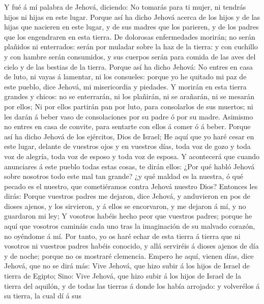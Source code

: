  Y fué á mí palabra de Jehová, diciendo:  No
tomarás para ti mujer, ni tendrás hijos ni hijas en este lugar.
 Porque así ha dicho Jehová acerca de los hijos y de las
hijas que nacieren en este lugar, y de sus madres que los parieren, y de
los padres que los engendraren en esta tierra.  De
dolorosas enfermedades morirán; no serán plañidos ni enterrados: serán
por muladar sobre la haz de la tierra: y con cuchillo y con hambre serán
consumidos, y sus cuerpos serán para comida de las aves del cielo y de
las bestias de la tierra.  Porque así ha dicho Jehová: No
entres en casa de luto, ni vayas á lamentar, ni los consueles: porque yo
he quitado mi paz de este pueblo, dice Jehová, mi misericordia y
piedades.  Y morirán en esta tierra grandes y chicos: no
se enterrarán, ni los plañirán, ni se arañarán, ni se mesarán por ellos;
 Ni por ellos partirán pan por luto, para consolarlos de
sus muertos; ni les darán á beber vaso de consolaciones por su padre ó
por su madre.  Asimismo no entres en casa de convite, para
sentarte con ellos á comer ó á beber.  Porque así ha dicho
Jehová de los ejércitos, Dios de Israel; He aquí que yo haré cesar en
este lugar, delante de vuestros ojos y en vuestros días, toda voz de
gozo y toda voz de alegría, toda voz de esposo y toda voz de esposa.
 Y acontecerá que cuando anunciares á este pueblo todas
estas cosas, te dirán ellos: ¿Por qué habló Jehová sobre nosotros todo
este mal tan grande? ¿y qué maldad es la nuestra, ó qué pecado es el
nuestro, que cometiéramos contra Jehová nuestro Dios? 
Entonces les dirás: Porque vuestros padres me dejaron, dice Jehová, y
anduvieron en pos de dioses ajenos, y los sirvieron, y á ellos se
encorvaron, y me dejaron á mí, y no guardaron mi ley;  Y
vosotros habéis hecho peor que vuestros padres; porque he aquí que
vosotros camináis cada uno tras la imaginación de su malvado corazón, no
oyéndome á mí.  Por tanto, yo os haré echar de esta
tierra á tierra que ni vosotros ni vuestros padres habéis conocido, y
allá serviréis á dioses ajenos de día y de noche; porque no os mostraré
clemencia.  Empero he aquí, vienen días, dice Jehová, que
no se dirá más: Vive Jehová, que hizo subir á los hijos de Israel de
tierra de Egipto;  Sino: Vive Jehová, que hizo subir á
los hijos de Israel de la tierra del aquilón, y de todas las tierras á
donde los había arrojado: y volverélos á su tierra, la cual dí á sus
